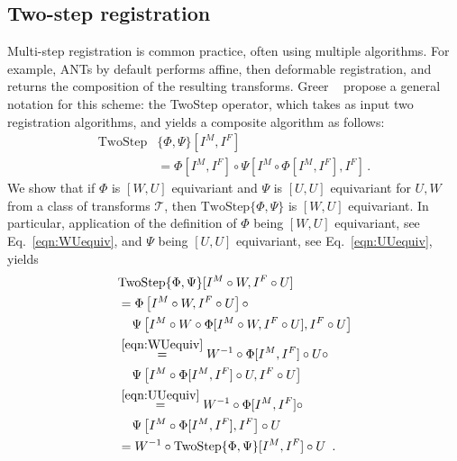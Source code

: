 \subsection{Two-step registration}
\label{sec:two_step_registration}
\label{twostepproof}
Multi-step registration is common practice, often using multiple algorithms. For example, ANTs \cite{avants2008symmetric} by default performs affine, then deformable registration, and returns the composition of the resulting transforms. Greer \etal~\cite{greer2021icon} propose a general notation for this scheme: the TwoStep operator, which takes as input two registration algorithms, and yields a composite algorithm as follows:
\begin{align}\text{TwoStep}&\{\Phi, \Psi\}[I^M, I^F] \nonumber \\ &= \Phi[I^M, I^F] \circ \Psi[I^M \circ \Phi[I^M, I^F], I^F]\,.\end{align}
We show that if $\Phi$ is $[W, U]$ equivariant and $\Psi$ is $[U, U]$ equivariant for $U,W$
from a class of transforms $\mathcal{T}$, then $\text{TwoStep}\{\Phi, \Psi\}$ is
$[W, U]$ equivariant. In particular, application of the definition of $\Phi$ being $[W, U]$ equivariant, see Eq.~\eqref{eqn:WUequiv}, and $\Psi$ being $[U, U]$ equivariant, see Eq.~\eqref{eqn:UUequiv}, yields
\begin{equation}
	\begin{split}
		& \text{TwoStep}\{\Phi, \Psi\}[I^M \circ W, I^F \circ U]  \\                 
		& \vspace{0.5cm}= \Phi\left[I^M \circ W, I^F \circ U\right] \circ \\
        & \vspace{0.5cm}\phantom{=~} \Psi\left[I^M \circ W \circ \Phi[I^M \circ W, I^F \circ U], I^F \circ U\right] \\
        & \vspace{0.5cm}\stackrel{\eqref{eqn:WUequiv}}{=} W^{-1} \circ \Phi[I^M, I^F] \circ U \circ \\
        & \vspace{0.5cm}\phantom{=~} \Psi\left[I^M \circ \Phi[I^M, I^F] \circ U, I^F \circ U\right] \\
        & \vspace{0.5cm}\stackrel{\eqref{eqn:UUequiv}}{=} W^{-1} \circ \Phi[I^M, I^F] \circ \\ 
        & \vspace{0.5cm}\phantom{=~} \Psi\left[I^M \circ \Phi[I^M, I^F], I^F\right] \circ U \\
        &  \vspace{0.5cm}=W^{-1} \circ \text{TwoStep}\{\Phi, \Psi\}[I^M, I^F] \circ U\enspace.
    \end{split}
\end{equation}
